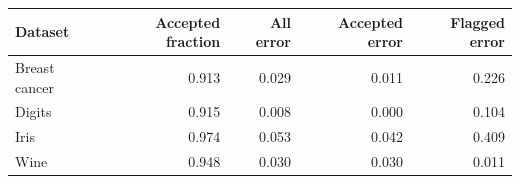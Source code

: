 \begin{tabular}{lrrrr}
\toprule
Dataset & Accepted fraction & All error & Accepted error & Flagged error \\
\midrule
Breast cancer & 0.913 & 0.029 & 0.011 & 0.226 \\
Digits & 0.915 & 0.008 & 0.000 & 0.104 \\
Iris & 0.974 & 0.053 & 0.042 & 0.409 \\
Wine & 0.948 & 0.030 & 0.030 & 0.011 \\
\bottomrule
\end{tabular}
